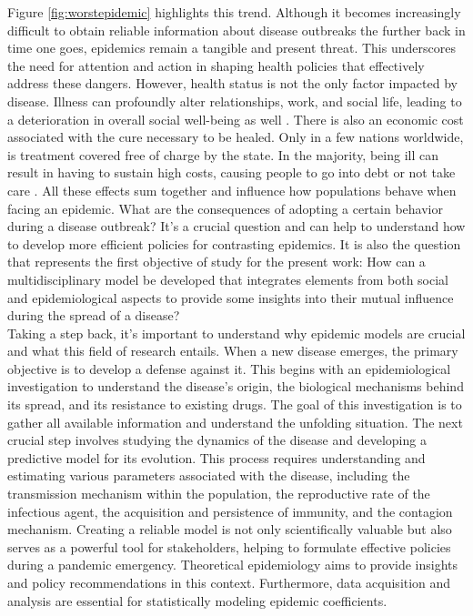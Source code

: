 Figure \ref{fig:worstepidemic} highlights this trend. Although it becomes increasingly difficult to obtain reliable information about disease outbreaks the further back in time one goes, epidemics remain a tangible and present threat. This underscores the need for attention and action in shaping health policies that effectively address these dangers.
However, health status is not the only factor impacted by disease. Illness can profoundly alter relationships, work, and social life, leading to a deterioration in overall social well-being as well \cite{Yang_2020}. 
There is also an economic cost associated with the cure necessary to be healed. Only in a few nations worldwide, is treatment covered free of charge by the state. In the majority, being ill can result in having to sustain high costs, causing people to go into debt or not take care \cite{esteban_2017, Barlow2021}. 
All these effects sum together and influence how populations behave when facing an epidemic. What are the consequences of adopting a certain behavior during a disease outbreak? It's a crucial question and can help to understand how to develop more efficient policies for contrasting epidemics. It is also the question that represents the first objective of study for the present work: How can a multidisciplinary model be developed that integrates elements from both social and epidemiological aspects to provide some insights into their mutual influence during the spread of a disease?
\\
\newline
Taking a step back, it's important to understand why epidemic models are crucial and what this field of research entails.
When a new disease emerges, the primary objective is to develop a defense against it. This begins with an epidemiological investigation to understand the disease's origin, the biological mechanisms behind its spread, and its resistance to existing drugs. The goal of this investigation is to gather all available information and understand the unfolding situation.
The next crucial step involves studying the dynamics of the disease and developing a predictive model for its evolution. This process requires understanding and estimating various parameters associated with the disease, including the transmission mechanism within the population, the reproductive rate of the infectious agent, the acquisition and persistence of immunity, and the contagion mechanism.
Creating a reliable model is not only scientifically valuable but also serves as a powerful tool for stakeholders, helping to formulate effective policies during a pandemic emergency. Theoretical epidemiology aims to provide insights and policy recommendations in this context. Furthermore, data acquisition and analysis are essential for statistically modeling epidemic coefficients. 
